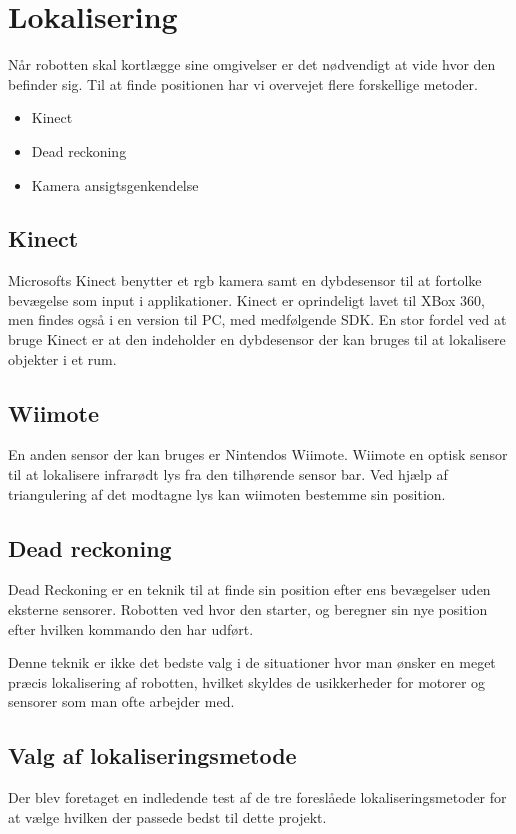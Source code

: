 \section{Lokalisering}
Når robotten skal kortlægge sine omgivelser er det nødvendigt at vide hvor den befinder sig.
Til at finde positionen har vi overvejet flere forskellige metoder.
\begin{itemize}
\item Kinect
\item Dead reckoning
\item Kamera ansigtsgenkendelse 
\end{itemize}

\subsection{Kinect }
Microsofts Kinect benytter et rgb kamera samt en dybdesensor til at fortolke bevægelse som input i applikationer.
Kinect er oprindeligt lavet til XBox 360, men findes også i en version til PC, med medfølgende SDK.
En stor fordel ved at bruge Kinect er at den indeholder en dybdesensor der kan bruges til at lokalisere objekter i et rum.


\subsection{Wiimote}
En anden sensor der kan bruges er Nintendos Wiimote. 
Wiimote en optisk sensor til at lokalisere infrarødt lys fra den tilhørende sensor bar.
Ved hjælp af triangulering af det modtagne lys kan wiimoten bestemme sin position. \cite{wiimote}

\subsection{Dead reckoning}
Dead Reckoning er en teknik til at finde sin position efter ens bevægelser uden eksterne sensorer.
Robotten ved hvor den starter, og beregner sin nye position efter hvilken kommando den har udført.\cite{deadrec}

Denne teknik er ikke det bedste valg i de situationer hvor man ønsker en meget præcis lokalisering af robotten, hvilket skyldes de usikkerheder for motorer og sensorer som man ofte arbejder med.

\subsection{Valg af lokaliseringsmetode}
Der blev foretaget en indledende test af de tre foreslåede lokaliseringsmetoder for at vælge hvilken der passede bedst til dette projekt.

